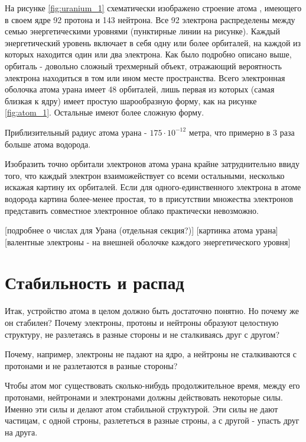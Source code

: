 На рисунке \ref{fig:uranium_1} схематически изображено строение атома , имеющего в своем ядре 92 протона и 143 нейтрона.
Все 92 электрона распределены между семью энергетическими уровнями (пунктирные линии на рисунке).
Каждый энергетический уровень включает в себя одну или более орбиталей, на каждой из которых находится один или два электрона.
Как было подробно описано выше, орбиталь - довольно сложный трехмерный объект, отражающий вероятность электрона находиться в том или ином месте пространства. 
Всего электронная оболочка атома урана имеет 48 орбиталей, лишь первая из которых (самая близкая к ядру) имеет простую шарообразную форму, как на рисунке \ref{fig:atom_1}.
Остальные имеют более сложную форму.

Приблизительный радиус атома урана - $175\cdot 10^{-12}$ метра, что примерно в 3 раза больше атома водорода.


Изобразить точно орбитали электронов атома урана крайне затруднительно ввиду того, что каждый электрон взаиможействует со всеми остальными, несколько искажая картину их орбиталей.
Если для одного-единственного электрона в атоме водорода картина более-менее простая, то в присутствии множества электронов представить совместное электронное облако практически невозможно.
  





[подробнее о числах для Урана (отдельная секция?)]
[картинка атома урана]
[валентные электроны - на внешней оболочке каждого энергетического уровня]


\section*{Стабильность и распад}

Итак, устройство атома в целом должно быть достаточно понятно.
Но почему же он стабилен?
Почему электроны, протоны и нейтроны образуют целостную структуру, не разлетаясь в разные стороны и не сталкиваясь друг с другом?


Почему, например, электроны не падают на ядро, а нейтроны не сталкиваются с протонами и не разлетаются в разные стороны?


Чтобы атом мог существовать сколько-нибудь продолжительное время, между его протонами, нейтронами и электронами должны действовать некоторые силы.
Именно эти силы и делают атом стабильной структурой.
Эти силы не дают частицам, с одной строны, разлететься в разные строны, а с другой - упасть друг на друга.



